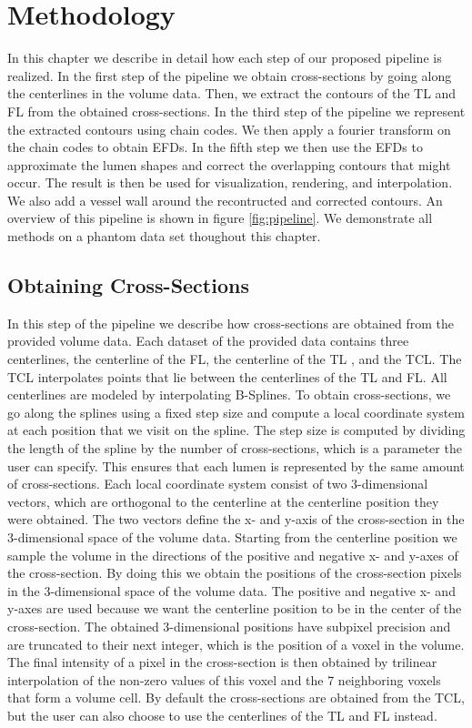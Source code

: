 \documentclass[thesis.tex]{subfiles}
\begin{document}
\chapter{Methodology}\label{chap:basics}

In this chapter we describe in detail how each step of our proposed pipeline is realized. In the first step of the pipeline we obtain cross-sections by going along the centerlines in the volume data. Then, we extract the contours of the TL and FL from the obtained cross-sections. In the third step of the pipeline we represent the extracted contours using chain codes. We then apply a fourier transform on the chain codes to obtain EFDs. In the fifth step we then use the EFDs to approximate the lumen shapes and correct the overlapping contours that might occur. The result is then be used for visualization, rendering, and interpolation. We also add a vessel wall around the recontructed and corrected contours. An overview of this pipeline is shown in figure \ref{fig:pipeline}. We demonstrate all methods on a phantom data set thoughout this chapter. 

\section{Obtaining Cross-Sections}
In this step of the pipeline we describe how cross-sections are obtained from the provided volume data. Each dataset of the provided data contains three centerlines, the centerline of the FL, the centerline of the TL , and the TCL. The TCL interpolates points that lie between the centerlines of the TL and FL. All centerlines are modeled by interpolating B-Splines. To obtain cross-sections, we go along the splines using a fixed step size and compute a local coordinate system at each position that we visit on the spline. The step size is computed by dividing the length of the spline by the number of cross-sections, which is a parameter the user can specify. This ensures that each lumen is represented by the same amount of cross-sections. Each local coordinate system consist of two 3-dimensional vectors, which are orthogonal to the centerline at the centerline position they were obtained. The two vectors define the x- and y-axis of the cross-section in the 3-dimensional space of the volume data. Starting from the centerline position we sample the volume in the directions of the positive and negative x- and y-axes of the cross-section. By doing this we obtain the positions of the cross-section pixels in the 3-dimensional space of the volume data. The positive and negative x- and y-axes are used because we want the centerline position to be in the center of the cross-section. The obtained 3-dimensional positions have subpixel precision and are truncated to their next integer, which is the position of a voxel in the volume. The final intensity of a pixel in the cross-section is then obtained by trilinear interpolation of the non-zero values of this voxel and the 7 neighboring voxels that form a volume cell.
By default the cross-sections are obtained from the TCL, but the user can also choose to use the centerlines of the TL and FL instead. \\
\end{document}
